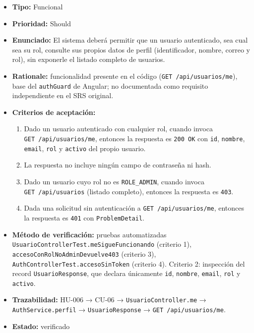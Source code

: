 \documentclass[
  spanish,
]{article}
\providecommand{\tightlist}{%
  \setlength{\itemsep}{0pt}\setlength{\parskip}{0pt}}
\begin{document}
\begin{itemize}
\tightlist
\item
  \textbf{Tipo:} Funcional
\item
  \textbf{Prioridad:} Should
\item
  \textbf{Enunciado:} El sistema deberá permitir que un usuario
  autenticado, sea cual sea su rol, consulte sus propios datos de perfil
  (identificador, nombre, correo y rol), sin exponerle el listado
  completo de usuarios.
\item
  \textbf{Rationale:} funcionalidad presente en el código
  (\texttt{GET\ /\allowbreak{}api/\allowbreak{}usuarios/\allowbreak{}me}), base del \texttt{auth\allowbreak{}Guard} de
  Angular; no documentada como requisito independiente en el SRS
  original.
\item
  \textbf{Criterios de aceptación:}

  \begin{enumerate}
  \def\labelenumi{\arabic{enumi}.}
  \tightlist
  \item
    Dado un usuario autenticado con cualquier rol, cuando invoca
    \texttt{GET\ /\allowbreak{}api/\allowbreak{}usuarios/\allowbreak{}me}, entonces la respuesta es
    \texttt{200\ OK} con \texttt{id}, \texttt{nombre}, \texttt{email},
    \texttt{rol} y \texttt{activo} del propio usuario.
  \item
    La respuesta no incluye ningún campo de contraseña ni hash.
  \item
    Dado un usuario cuyo rol no es \texttt{ROLE\_\allowbreak{}ADMIN}, cuando invoca
    \texttt{GET\ /\allowbreak{}api/\allowbreak{}usuarios} (listado completo), entonces la
    respuesta es \texttt{403}.
  \item
    Dada una solicitud sin autenticación a
    \texttt{GET\ /\allowbreak{}api/\allowbreak{}usuarios/\allowbreak{}me}, entonces la respuesta es
    \texttt{401} con \texttt{Problem\allowbreak{}Detail}.
  \end{enumerate}
\item
  \textbf{Método de verificación:} pruebas automatizadas
  \texttt{Usuario\allowbreak{}Controller\allowbreak{}Test.\allowbreak{}me\allowbreak{}Sigue\allowbreak{}Funcionando} (criterio 1),
  \texttt{acceso\allowbreak{}Con\allowbreak{}Rol\allowbreak{}No\allowbreak{}Admin\allowbreak{}Devuelve403} (criterio 3),
  \texttt{Auth\allowbreak{}Controller\allowbreak{}Test.\allowbreak{}acceso\allowbreak{}Sin\allowbreak{}Token} (criterio 4). Criterio 2:
  inspección del record \texttt{Usuario\allowbreak{}Response}, que declara únicamente
  \texttt{id}, \texttt{nombre}, \texttt{email}, \texttt{rol} y
  \texttt{activo}.
\item
  \textbf{Trazabilidad:} HU-006 → CU-06 → \texttt{Usuario\allowbreak{}Controller.\allowbreak{}me}
  → \texttt{Auth\allowbreak{}Service.\allowbreak{}perfil} → \texttt{Usuario\allowbreak{}Response} →
  \texttt{GET\ /\allowbreak{}api/\allowbreak{}usuarios/\allowbreak{}me}.
\item
  \textbf{Estado:} verificado
\end{itemize}
\end{document}
